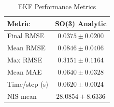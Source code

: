 \begin{table}[htbp]
\centering
\caption{EKF Performance Metrics}
\label{tab:ekf_performance}
\begin{tabular}{lc}
\hline
Metric & SO(3) Analytic \\
\hline
Final RMSE & $0.0375 \pm 0.0200$ \\
Mean RMSE & $0.0846 \pm 0.0406$ \\
Max RMSE & $0.3151 \pm 0.1164$ \\
Mean MAE & $0.0640 \pm 0.0328$ \\
Time/step (s) & $0.0620 \pm 0.0024$ \\
NIS mean & $28.0854 \pm 8.6336$ \\
\hline
\end{tabular}
\end{table}
